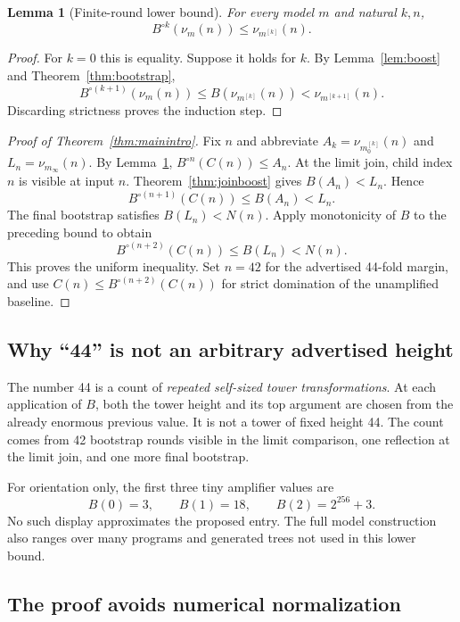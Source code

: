 \documentclass[11pt,letterpaper]{article}
\newtheorem{lemma}[theorem]{Lemma}
\theoremstyle{definition}
\begin{document}
\begin{lemma}[Finite-round lower bound]
\label{lem:rounds}
For every model $m$ and natural $k,n$,
\[
 B^{\circ k}(\nu_m(n))\le\nu_{m^{[k]}}(n).
\]
\end{lemma}
\begin{proof}
For $k=0$ this is equality. Suppose it holds for $k$. By
Lemma~\ref{lem:boost} and Theorem~\ref{thm:bootstrap},
\[
 B^{\circ(k+1)}(\nu_m(n))
 \le B(\nu_{m^{[k]}}(n))
 <\nu_{m^{[k+1]}}(n).
\]
Discarding strictness proves the induction step.
\end{proof}

\begin{proof}[Proof of Theorem~\ref{thm:mainintro}]
Fix $n$ and abbreviate $A_k=\nu_{m_0^{[k]}}(n)$ and
$L_n=\nu_{m_\infty}(n)$. By Lemma~\ref{lem:rounds},
$B^{\circ n}(C(n))\le A_n$. At the limit join, child index $n$ is visible at
input $n$. Theorem~\ref{thm:joinboost} gives $B(A_n)<L_n$. Hence
\[
 B^{\circ(n+1)}(C(n))\le B(A_n)<L_n.
\]
The final bootstrap satisfies $B(L_n)<N(n)$. Apply monotonicity of $B$ to the
preceding bound to obtain
\[
 B^{\circ(n+2)}(C(n))\le B(L_n)<N(n).
\]
This proves the uniform inequality. Set $n=42$ for the advertised 44-fold
margin, and use $C(n)\le B^{\circ(n+2)}(C(n))$ for strict domination of the
unamplified baseline.
\end{proof}

\subsection{Why ``44'' is not an arbitrary advertised height}

The number 44 is a count of \emph{repeated self-sized tower transformations}.
At each application of $B$, both the tower height and its top argument are
chosen from the already enormous previous value. It is not a tower of fixed
height 44. The count comes from 42 bootstrap rounds visible in the limit
comparison, one reflection at the limit join, and one more final bootstrap.

For orientation only, the first three tiny amplifier values are
\[
 B(0)=3,\qquad B(1)=18,\qquad B(2)=2^{256}+3.
\]
No such display approximates the proposed entry. The full model construction
also ranges over many programs and generated trees not used in this lower
bound.

\subsection{The proof avoids numerical normalization}
\end{document}
